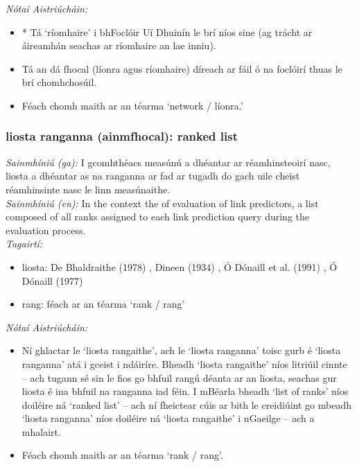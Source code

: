 \documentclass{article}
\begin{document}
 \noindent \textit{Nótaí Aistriúcháin:}
\begin{itemize}
	\item * Tá `ríomhaire' i bhFoclóir Uí Dhuinín le brí níos sine (ag trácht ar áireamhán seachas ar ríomhaire an lae inniu).
	\item Tá an dá fhocal (líonra agus ríomhaire) díreach ar fáil ó na foclóirí thuas le brí chomhchosúil.
	\item Féach chomh maith ar an téarma `network / líonra.'
\end{itemize}


\subsubsection*{liosta ranganna (ainmfhocal): ranked list}
 \noindent \textit{Sainmhíniú (ga):} I gcomhthéacs measúnú a dhéantar ar réamhinsteoirí nasc, liosta a dhéantar as na ranganna ar fad ar tugadh do gach uile cheist réamhinsinte nasc le linn measúnaithe.
\\
 \noindent \textit{Sainmhíniú (en):} In the context the of evaluation of link predictors, a list composed of all ranks assigned to each link prediction query during the evaluation process.
\\
 \noindent \textit{Tagairtí:}
\begin{itemize}
	\item liosta: De Bhaldraithe (1978) \cite{de-bhaldraithe}, Dineen (1934) \cite{dineen}, Ó Dónaill et al. (1991) \cite{focloir-beag}, Ó Dónaill (1977) \cite{odonaill}
	\item rang: féach ar an téarma `rank / rang'
\end{itemize}

 \noindent \textit{Nótaí Aistriúcháin:}
\begin{itemize}
	\item Ní ghlactar le `liosta rangaithe', ach le `liosta ranganna' toisc gurb é `liosta ranganna' atá i gceist i ndáiríre. Bheadh `liosta rangaithe' níos litriúil cinnte -- ach tugann sé sin le fios go bhfuil rangú déanta ar an liosta, seachas gur liosta é ina bhfuil na ranganna iad féin. I mBéarla  bheadh `list of ranks' níos doiléire ná `ranked list' -- ach ní fheictear cúis ar bith le creidiúint go mbeadh `liosta ranganna' níos doiléire ná `liosta rangaithe' i nGaeilge -- ach a mhalairt.
	\item Féach chomh maith ar an téarma `rank / rang'.
\end{itemize}
\end{document}
